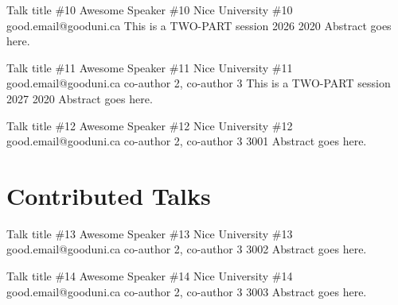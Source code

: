 \documentclass[12pt,a4paper,figuresright]{book}
\begin{document}
\begin{talk}
	{Talk title \#10}%
	{Awesome Speaker \#10}%
	{Nice University \#10}%
	{good.email@gooduni.ca}%
	{}%
	{This is a TWO-PART session}%
	{}%
	{2026}%
	{2020}%
	Abstract goes here.
\end{talk}

\begin{talk}
	{Talk title \#11}%
	{Awesome Speaker \#11}%
	{Nice University \#11}%
	{good.email@gooduni.ca}%
	{co-author 2, co-author 3}%
	{This is a TWO-PART session}%
	{}%
	{2027}%
	{2020}%
	Abstract goes here.
\end{talk}

\begin{talk}
	{Talk title \#12}%
	{Awesome Speaker \#12}%
	{Nice University \#12}%
	{good.email@gooduni.ca}%
	{co-author 2, co-author 3}%
	{}%
	{}%
	{3001}%
	{}%
	Abstract goes here.
\end{talk}

\section{Contributed Talks}

\begin{talk}
	{Talk title \#13}%
	{Awesome Speaker \#13}%
	{Nice University \#13}%
	{good.email@gooduni.ca}%
	{co-author 2, co-author 3}%
	{}%
	{}%
	{3002}%
	{}%
	Abstract goes here.
\end{talk}

\begin{talk}
	{Talk title \#14}%
	{Awesome Speaker \#14}%
	{Nice University \#14}%
	{good.email@gooduni.ca}%
	{co-author 2, co-author 3}%
	{}%
	{}%
	{3003}%
	{}%
	Abstract goes here.
\end{talk}
\end{document}
